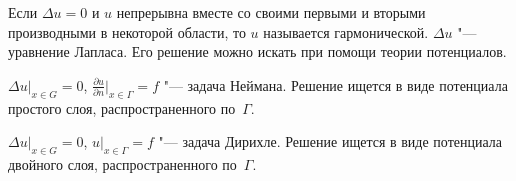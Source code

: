 \documentclass[a4paper,12pt]{article}
\begin{document}
Если $\Delta u=0$ и $u$ непрерывна вместе со своими первыми и вторыми
производными в некоторой области, то $u$ называется гармонической.
$\Delta u$ "--- уравнение Лапласа. Его решение можно искать при помощи
теории потенциалов.

$\Delta u|_{x\in G}=0$, $\frac{\partial u}{\partial n}|_{x\in\Gamma}=f$
"--- задача Неймана. Решение ищется в виде потенциала простого слоя,
распространенного по~$\Gamma$.

$\Delta u|_{x\in G}=0$, $u|_{x\in\Gamma}=f$ "--- задача Дирихле.
Решение ищется в виде потенциала двойного слоя, распространенного
по~$\Gamma$.
\end{document}
